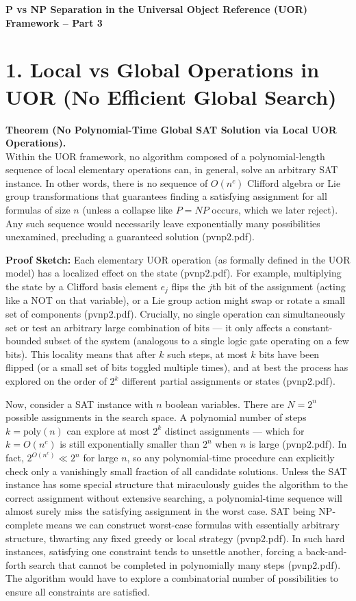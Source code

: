 \documentclass[11pt]{article}
\begin{document}
\begin{center}
    {\LARGE \bf P vs NP Separation in the Universal Object Reference (UOR) Framework -- Part 3}
\end{center}
\vspace{1em}

\section*{1. Local vs Global Operations in UOR (No Efficient Global Search)}

\textbf{Theorem (No Polynomial-Time Global SAT Solution via Local UOR Operations).} \\
Within the UOR framework, no algorithm composed of a polynomial-length sequence of local elementary operations can, in general, solve an arbitrary SAT instance. In other words, there is no sequence of \(O(n^c)\) Clifford algebra or Lie group transformations that guarantees finding a satisfying assignment for all formulas of size \(n\) (unless a collapse like \(P=NP\) occurs, which we later reject). Any such sequence would necessarily leave exponentially many possibilities unexamined, precluding a guaranteed solution (pvnp2.pdf).

\textbf{Proof Sketch:} Each elementary UOR operation (as formally defined in the UOR model) has a localized effect on the state (pvnp2.pdf). For example, multiplying the state by a Clifford basis element \(e_j\) flips the \(j\)th bit of the assignment (acting like a NOT on that variable), or a Lie group action might swap or rotate a small set of components (pvnp2.pdf). Crucially, no single operation can simultaneously set or test an arbitrary large combination of bits --- it only affects a constant-bounded subset of the system (analogous to a single logic gate operating on a few bits). This locality means that after \(k\) such steps, at most \(k\) bits have been flipped (or a small set of bits toggled multiple times), and at best the process has explored on the order of \(2^k\) different partial assignments or states (pvnp2.pdf).

Now, consider a SAT instance with \(n\) boolean variables. There are \(N = 2^n\) possible assignments in the search space. A polynomial number of steps \(k = \mathrm{poly}(n)\) can explore at most \(2^k\) distinct assignments --- which for \(k = O(n^c)\) is still exponentially smaller than \(2^n\) when \(n\) is large (pvnp2.pdf). In fact, \(2^{O(n^c)} \ll 2^n\) for large \(n\), so any polynomial-time procedure can explicitly check only a vanishingly small fraction of all candidate solutions. Unless the SAT instance has some special structure that miraculously guides the algorithm to the correct assignment without extensive searching, a polynomial-time sequence will almost surely miss the satisfying assignment in the worst case. SAT being NP-complete means we can construct worst-case formulas with essentially arbitrary structure, thwarting any fixed greedy or local strategy (pvnp2.pdf). In such hard instances, satisfying one constraint tends to unsettle another, forcing a back-and-forth search that cannot be completed in polynomially many steps (pvnp2.pdf). The algorithm would have to explore a combinatorial number of possibilities to ensure all constraints are satisfied.
\end{document}
